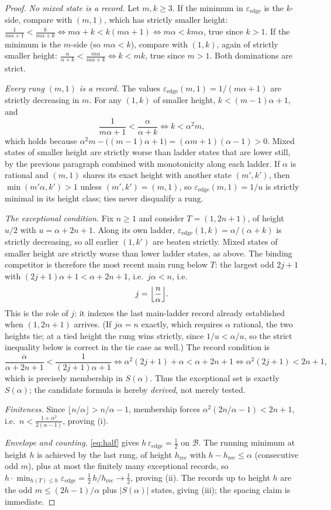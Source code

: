 \documentclass[11pt]{article}
\theoremstyle{definition}
\theoremstyle{remark}
\newcommand{\ee}{\varepsilon_{\mathrm{edge}}}
\newcommand{\B}{\mathcal{B}}
\begin{document}
\begin{proof}
\emph{No mixed state is a record.} Let $m,k\ge3$. If the minimum in $\ee$ is the $k$-side, compare with $(m,1)$, which has strictly smaller height:
$\frac{1}{m\alpha+1}<\frac{k}{m\alpha+k}\iff m\alpha+k<k(m\alpha+1)\iff m\alpha<km\alpha$, true since $k>1$. If the minimum is the $m$-side (so $m\alpha<k$), compare with $(1,k)$, again of strictly smaller height:
$\frac{\alpha}{\alpha+k}<\frac{m\alpha}{m\alpha+k}\iff k<mk$, true since $m>1$. Both dominations are strict.

\emph{Every rung $(m,1)$ is a record.} The values $\ee(m,1)=1/(m\alpha+1)$ are strictly decreasing in $m$. For any $(1,k)$ of smaller height, $k<(m-1)\alpha+1$, and
\[
\frac{1}{m\alpha+1}<\frac{\alpha}{\alpha+k}\iff k<\alpha^2 m,
\]
which holds because $\alpha^2m-\bigl((m-1)\alpha+1\bigr)=(\alpha m+1)(\alpha-1)>0$. Mixed states of smaller height are strictly worse than ladder states that are lower still, by the previous paragraph combined with monotonicity along each ladder. If $\alpha$ is rational and $(m,1)$ shares its exact height with another state $(m',k')$, then $\min(m'\alpha,k')>1$ unless $(m',k')=(m,1)$, so $\ee(m,1)=1/u$ is strictly minimal in its height class; ties never disqualify a rung.

\emph{The exceptional condition.} Fix $n\ge1$ and consider $T=(1,2n+1)$, of height $u/2$ with $u=\alpha+2n+1$. Along its own ladder, $\ee(1,k)=\alpha/(\alpha+k)$ is strictly decreasing, so all earlier $(1,k')$ are beaten strictly. Mixed states of smaller height are strictly worse than lower ladder states, as above. The binding competitor is therefore the most recent main rung below $T$: the largest odd $2j+1$ with $(2j+1)\alpha+1<\alpha+2n+1$, i.e.\ $j\alpha<n$, i.e.
\[
j=\Bigl\lfloor \frac n\alpha \Bigr\rfloor .
\]
This is the role of $j$: it indexes the last main-ladder record already established when $(1,2n+1)$ arrives. (If $j\alpha=n$ exactly, which requires $\alpha$ rational, the two heights tie; at a tied height the rung wins strictly, since $1/u<\alpha/u$, so the strict inequality below is correct in the tie case as well.) The record condition is
\[
\frac{\alpha}{\alpha+2n+1}<\frac{1}{(2j+1)\alpha+1}
\iff
\alpha^2(2j+1)+\alpha<\alpha+2n+1
\iff
\alpha^2(2j+1)<2n+1 ,
\]
which is precisely membership in $S(\alpha)$. Thus the exceptional set is exactly $S(\alpha)$; the candidate formula is hereby \emph{derived}, not merely tested.

\emph{Finiteness.} Since $\lfloor n/\alpha\rfloor>n/\alpha-1$, membership forces $\alpha^2(2n/\alpha-1)<2n+1$, i.e.\ $n<\frac{1+\alpha^2}{2(\alpha-1)}$, proving (i).

\emph{Envelope and counting.} \eqref{eq:half} gives $h\,\ee=\tfrac12$ on $\B$. The running minimum at height $h$ is achieved by the last rung, of height $h_{\mathrm{rec}}$ with $h-h_{\mathrm{rec}}\le\alpha$ (consecutive odd $m$), plus at most the finitely many exceptional records, so $h\cdot\min_{h(T)\le h}\ee=\tfrac12\,h/h_{\mathrm{rec}}\to\tfrac12$, proving (ii). The records up to height $h$ are the odd $m\le(2h-1)/\alpha$ plus $|S(\alpha)|$ states, giving (iii); the spacing claim is immediate.
\end{proof}
\end{document}
